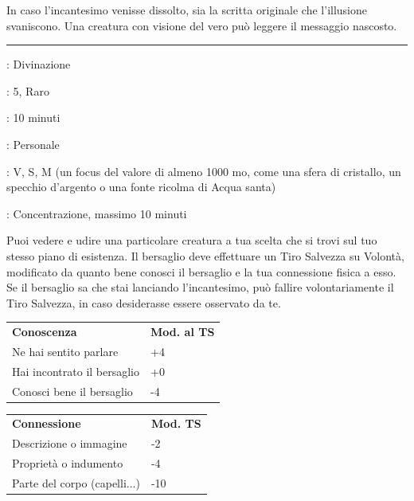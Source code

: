 \begin{multicols}{2}
In caso l'incantesimo venisse dissolto, sia la scritta originale che l'illusione svaniscono. Una creatura con visione del vero può leggere il messaggio nascosto.

\smallskip\noindent\rule{\linewidth}{2pt} \hypertarget{Scrutare}{}\smallskip{}
\noindent
\begin{description}[noitemsep, topsep=0pt, parsep=0pt, partopsep=0pt, leftmargin=0cm, labelwidth=2.8cm]
	\item[\textbf{Lista di Magia}]: Divinazione
	\item[\textbf{Livello}]: 5, Raro
	\item[\textbf{T. di Lancio}]: 10 minuti
	\item[\textbf{Gittata}]: Personale
	\item[\textbf{Componenti}]: V, S, M (un focus del valore di almeno 1000 mo, come una sfera di cristallo, un specchio d'argento o una fonte ricolma di Acqua santa)
	\item[\textbf{Durata}]: Concentrazione, massimo 10 minuti
\end{description}

Puoi vedere e udire una particolare creatura a tua scelta che si trovi sul tuo stesso piano di esistenza. Il bersaglio deve effettuare un Tiro Salvezza su Volontà, modificato da quanto bene conosci il bersaglio e la tua connessione fisica a esso. Se il bersaglio sa che stai lanciando l'incantesimo, può fallire volontariamente il Tiro Salvezza, in caso desiderasse essere osservato da
te.

\medskip

\begin{tabular}{ll}
	\toprule
	\textbf{Conoscenza} & \textbf{Mod. al TS}\\
	Ne hai sentito parlare &+4\\
	Hai incontrato il bersaglio &+0\\
	Conosci bene il bersaglio &-4
\end{tabular}

\begin{tabular}{ll}
	\toprule
	\textbf{Connessione} & \textbf{Mod. TS}\\
	Descrizione o immagine &-2\\
	Proprietà o indumento & -4\\
	Parte del corpo (capelli...)&-10
\end{tabular}

\medskip


\end{multicols}
